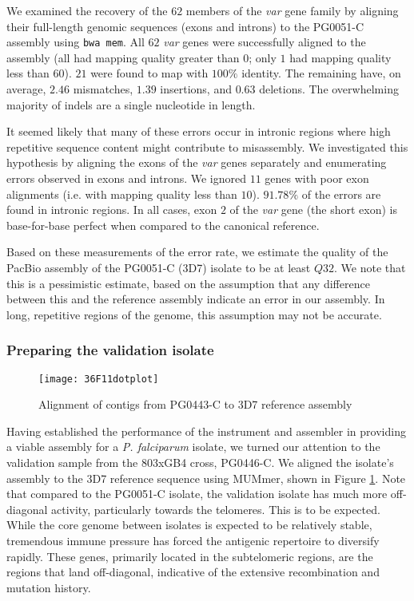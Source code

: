 We examined the recovery of the $62$ members of the \textit{var} gene family by aligning their full-length genomic sequences (exons and introns) to the PG0051-C assembly using \texttt{bwa mem}. All $62$ \textit{var} genes were successfully aligned to the assembly (all had mapping quality greater than $0$; only $1$ had mapping quality less than 60).  $21$ were found to map with $100\%$ identity. The remaining have, on average, $2.46$ mismatches, $1.39$ insertions, and $0.63$ deletions. The overwhelming majority of indels are a single nucleotide in length.

It seemed likely that many of these errors occur in intronic regions where high repetitive sequence content might contribute to misassembly. We investigated this hypothesis by aligning the exons of the \textit{var} genes separately and enumerating errors observed in exons and introns. We ignored $11$ genes with poor exon alignments (i.e. with mapping quality less than $10$). $91.78\%$ of the errors are found in intronic regions. In all cases, exon $2$ of the \textit{var} gene (the short exon) is base-for-base perfect when compared to the canonical reference.

Based on these measurements of the error rate, we estimate the quality of the PacBio assembly of the PG0051-C (3D7) isolate to be at least $Q32$.  We note that this is a pessimistic estimate, based on the assumption that any difference between this and the reference assembly indicate an error in our assembly.  In long, repetitive regions of the genome, this assumption may not be accurate.

\subsubsection{Preparing the validation isolate}

\begin{figure}[h!]
  \centering
    \texttt{[image: 36F11dotplot]}
  \caption{Alignment of contigs from PG0443-C to 3D7 reference assembly}
  \label{fig:valdotplot}
\end{figure}

Having established the performance of the instrument and assembler in providing a viable assembly for a \textit{P. falciparum} isolate, we turned our attention to the validation sample from the 803xGB4 cross, PG0446-C.  We aligned the isolate's assembly to the 3D7 reference sequence using MUMmer, shown in Figure \ref{fig:valdotplot}.  Note that compared to the PG0051-C isolate, the validation isolate has much more off-diagonal activity, particularly towards the telomeres.  This is to be expected.  While the core genome between isolates is expected to be relatively stable, tremendous immune pressure has forced the antigenic repertoire to diversify rapidly.  These genes, primarily located in the subtelomeric regions, are the regions that land off-diagonal, indicative of the extensive recombination and mutation history.

